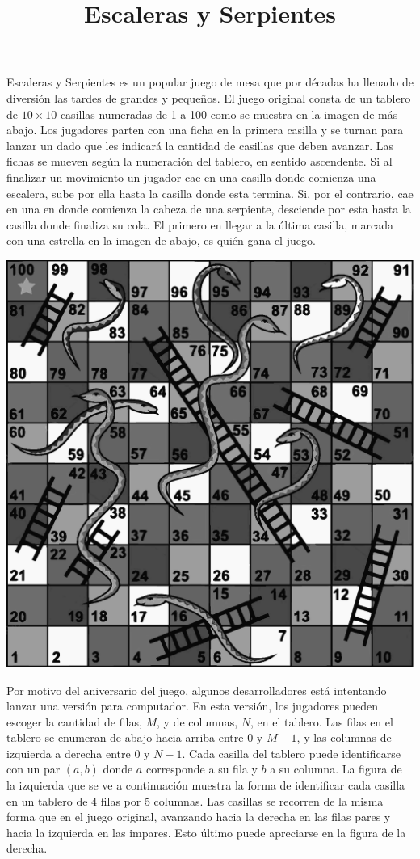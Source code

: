 \documentclass{oci}
\title{Escaleras y Serpientes}
\begin{document}
\begin{problemDescription}
  Escaleras y Serpientes es un popular juego de mesa que por décadas ha
  llenado de diversión las tardes de grandes y pequeños.
  El juego original consta de un tablero de $10\times 10$ casillas numeradas de
  1 a 100 como se muestra en la imagen de más abajo.
  Los jugadores parten con una ficha en la primera casilla y se turnan para
  lanzar un dado que les indicará la cantidad de casillas que deben avanzar.
  Las fichas se mueven según la numeración del tablero, en sentido ascendente.
  Si al finalizar un movimiento un jugador cae en una casilla donde comienza una
  escalera, sube por ella hasta la casilla donde esta termina.
  Si, por el contrario, cae en una en donde comienza la cabeza de una serpiente,
  desciende por esta hasta la casilla donde finaliza su cola.
  El primero en llegar a la última casilla, marcada con una estrella en la
  imagen de abajo, es quién gana el juego.

  \begin{center}
  \includegraphics[scale=0.7]{tablero}
  \end{center}

  Por motivo del aniversario del juego, algunos desarrolladores está intentando
  lanzar una versión para computador.
  En esta versión, los jugadores pueden escoger la cantidad de filas, $M$, y de
  columnas, $N$, en el tablero.
  Las filas en el tablero se enumeran de abajo hacia arriba entre 0 y $M-1$, y
  las columnas de izquierda a derecha entre 0 y $N-1$.
  Cada casilla del tablero puede identificarse con un par $(a, b)$ donde $a$
  corresponde a su fila y $b$ a su columna.
  La figura de la izquierda que se ve a continuación muestra la forma de
  identificar cada casilla en un tablero de 4 filas por 5 columnas.
  Las casillas se recorren de la misma forma que en el juego original, avanzando
  hacia la derecha en las filas pares y hacia la izquierda en las impares.
  Esto último puede apreciarse en la figura de la derecha.


\end{problemDescription}
\end{document}
